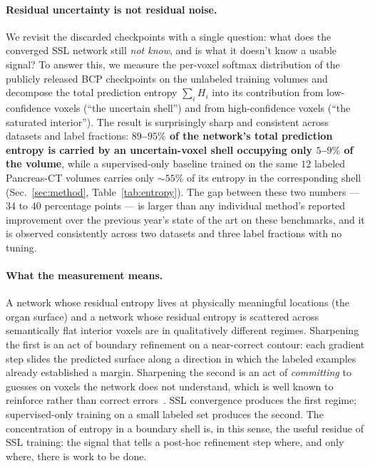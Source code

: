 \paragraph{Residual uncertainty is not residual noise.}
We revisit the discarded checkpoints with a single question: what does the converged SSL network still \emph{not know}, and is what it doesn't know a usable signal? To answer this, we measure the per-voxel softmax distribution of the publicly released BCP checkpoints on the unlabeled training volumes and decompose the total prediction entropy $\sum_i H_i$ into its contribution from low-confidence voxels (``the uncertain shell'') and from high-confidence voxels (``the saturated interior''). The result is surprisingly sharp and consistent across datasets and label fractions: \textbf{$89$--$95\%$ of the network's total prediction entropy is carried by an uncertain-voxel shell occupying only $5$--$9\%$ of the volume}, while a supervised-only baseline trained on the same $12$ labeled Pancreas-CT volumes carries only $\sim\!55\%$ of its entropy in the corresponding shell (Sec.~\ref{sec:method}, Table~\ref{tab:entropy}). The gap between these two numbers --- $34$ to $40$ percentage points --- is larger than any individual method's reported improvement over the previous year's state of the art on these benchmarks, and it is observed consistently across two datasets and three label fractions with no tuning.

\paragraph{What the measurement means.}
A network whose residual entropy lives at physically meaningful locations (the organ surface) and a network whose residual entropy is scattered across semantically flat interior voxels are in qualitatively different regimes. Sharpening the first is an act of boundary refinement on a near-correct contour: each gradient step slides the predicted surface along a direction in which the labeled examples already established a margin. Sharpening the second is an act of \emph{committing} to guesses on voxels the network does not understand, which is well known to reinforce rather than correct errors~\cite{grandvalet2004entropy,lee2013pseudolabel}. SSL convergence produces the first regime; supervised-only training on a small labeled set produces the second. The concentration of entropy in a boundary shell is, in this sense, the useful residue of SSL training: the signal that tells a post-hoc refinement step where, and only where, there is work to be done.

